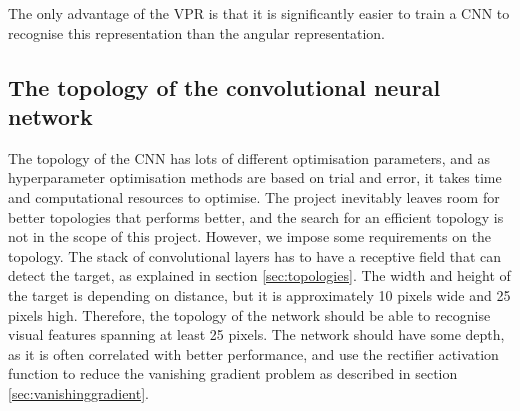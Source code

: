 The only advantage of the VPR is that it is significantly easier to train a CNN to recognise this representation than the angular representation.

\subsection{The topology of the convolutional neural network}
The topology of the CNN has lots of different optimisation parameters, and as hyperparameter optimisation methods are based on trial and error, it takes time and computational resources to optimise. The project inevitably leaves room for better topologies that performs better, and the search for an efficient topology is not in the scope of this project. However, we impose some requirements on the topology. The stack of convolutional layers has to have a receptive field that can detect the target, as explained in section \ref{sec:topologies}. The width and height of the target is depending on distance, but it is approximately 10 pixels wide and 25 pixels high. Therefore, the topology of the network should be able to recognise visual features spanning at least 25 pixels. The network should have some depth, as it is often correlated with better performance\cite{christian}\cite{karen}, and use the rectifier activation function to reduce the vanishing gradient problem as described in section \ref{sec:vanishinggradient}.





































